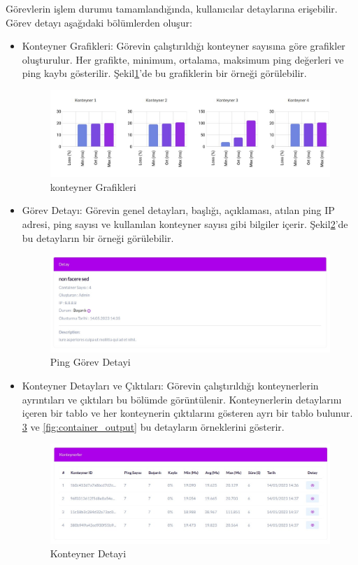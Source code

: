 Görevlerin işlem durumu tamamlandığında, kullanıcılar detaylarına erişebilir. Görev detayı aşağıdaki bölümlerden oluşur:
\begin{itemize}
	\item Konteyner Grafikleri: Görevin çalıştırıldığı konteyner sayısına göre grafikler oluşturulur. Her grafikte, minimum, ortalama, maksimum ping değerleri ve ping kaybı gösterilir. Şekil\ref{fig:container_graphic}'de bu grafiklerin bir örneği görülebilir.
	      \begin{figure}[ht]
		      \centering
		      \includegraphics[width=0.7\linewidth]{images/ping_graphic.jpeg}
		      \caption{konteyner Grafikleri}
		      \label{fig:container_graphic}
	      \end{figure}

	\item Görev Detayı: Görevin genel detayları, başlığı, açıklaması, atılan ping IP adresi, ping sayısı ve kullanılan konteyner sayısı gibi bilgiler içerir. Şekil\ref{fig:ping_detail}'de bu detayların bir örneği görülebilir.
	      \begin{figure}[ht]
		      \centering
		      \includegraphics[width=0.7\linewidth]{images/ping_detail.jpeg}
		      \caption{Ping Görev Detayi}
		      \label{fig:ping_detail}
	      \end{figure}

	\item Konteyner Detayları ve Çıktıları: Görevin çalıştırıldığı konteynerlerin ayrıntıları ve çıktıları bu bölümde görüntülenir. Konteynerlerin detaylarını içeren bir tablo ve her konteynerin çıktılarını gösteren ayrı bir tablo bulunur. \ref{fig:container_detail} ve \ref{fig:container_output} bu detayların örneklerini gösterir.
	      \begin{figure}[ht]
		      \centering
		      \includegraphics[width=0.7\linewidth]{images/container_detail.jpeg}
		      \caption{Konteyner Detayi}
		      \label{fig:container_detail}
	      \end{figure}


\end{itemize}
